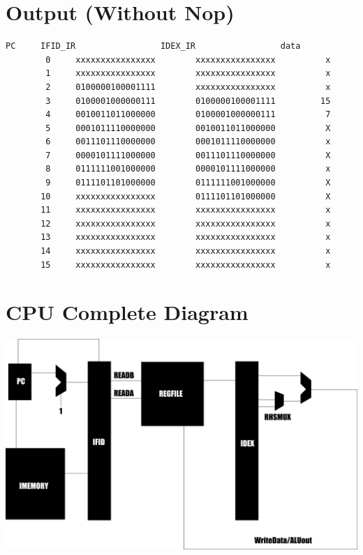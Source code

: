 \documentclass{article}
\newenvironment{problem}[1]{
  \nobreak\section*{#1}
}{}
\begin{document}
  \begin{problem}{Output (Without Nop)}
    \begin{center}
      \begin{lstlisting}[basicstyle=\footnotesize\ttfamily]
        PC     IFID_IR                 IDEX_IR                 data
        0     xxxxxxxxxxxxxxxx        xxxxxxxxxxxxxxxx          x
        1     xxxxxxxxxxxxxxxx        xxxxxxxxxxxxxxxx          x
        2     0100000100001111        xxxxxxxxxxxxxxxx          x
        3     0100001000000111        0100000100001111         15
        4     0010011011000000        0100001000000111          7
        5     0001011110000000        0010011011000000          X
        6     0011101110000000        0001011110000000          x
        7     0000101111000000        0011101110000000          X
        8     0111111001000000        0000101111000000          x
        9     0111101101000000        0111111001000000          X
       10     xxxxxxxxxxxxxxxx        0111101101000000          X
       11     xxxxxxxxxxxxxxxx        xxxxxxxxxxxxxxxx          x
       12     xxxxxxxxxxxxxxxx        xxxxxxxxxxxxxxxx          x
       13     xxxxxxxxxxxxxxxx        xxxxxxxxxxxxxxxx          x
       14     xxxxxxxxxxxxxxxx        xxxxxxxxxxxxxxxx          x
       15     xxxxxxxxxxxxxxxx        xxxxxxxxxxxxxxxx          x
      \end{lstlisting}
    \end{center}
  \end{problem}

  \pagebreak
  \begin{problem}{CPU Complete Diagram}
    \includegraphics[scale=0.3]{text898.png}
  \end{problem}
\end{document}

